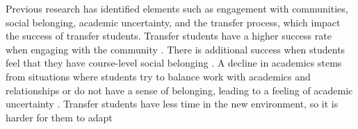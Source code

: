 \documentclass{article}
\begin{document}
Previous research has identified elements such as engagement with communities, social belonging, academic uncertainty, and the transfer process, which impact the success of transfer students. Transfer students have a higher success rate when engaging with the community \cite{ucregents2022}. There is additional success when students feel that they have course-level social belonging \cite{edwards2021relationship}. A decline in academics stems from situations where students try to balance work with academics and relationships or do not have a sense of belonging, leading to a feeling of academic uncertainty \cite{hohne2019belonging}. Transfer students have less time in the new environment, so it is harder for them to adapt \cite{blekic2020continuing}


\end{document}
